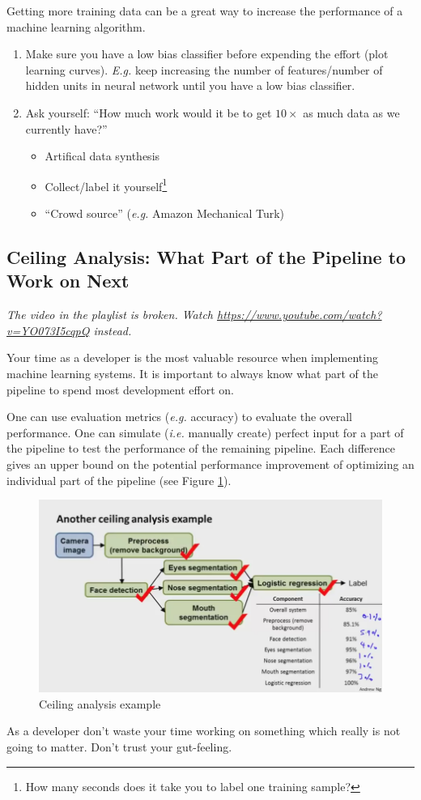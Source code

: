 \documentclass[a4paper,twoside,10pt]{article}
\begin{document}
Getting more training data can be a great way to increase the performance of a machine learning algorithm.
\begin{enumerate}
  \item Make sure you have a low bias classifier before expending the effort (plot learning curves). \emph{E.g.} keep increasing the number of features/number of hidden units in neural network until you have a low bias classifier.
  \item Ask yourself: ``How much work would it be to get $10\times$ as much data as we currently have?''
    \begin{itemize}
      \item Artifical data synthesis
      \item Collect/label it yourself\footnote{How many seconds does it take you to label one training sample?}
      \item ``Crowd source'' (\emph{e.g.} Amazon Mechanical Turk)
    \end{itemize}
\end{enumerate}

\subsection{Ceiling Analysis: What Part of the Pipeline to Work on Next}
\begin{footnotesize}
  \emph{The video in the playlist is broken. Watch \url{https://www.youtube.com/watch?v=YO073I5cqpQ} instead.}
\end{footnotesize}
Your time as a developer is the most valuable resource when implementing machine learning systems.
It is important to always know what part of the pipeline to spend most development effort on.

One can use evaluation metrics (\emph{e.g.} accuracy) to evaluate the overall performance.
One can simulate (\emph{i.e.} manually create) perfect input for a part of the pipeline to test the performance of the remaining pipeline. Each difference gives an upper bound on the potential performance improvement of optimizing an individual part of the pipeline (see Figure \ref{fig:ceiling}).
\begin{figure}[htbp]
  \begin{center}
    \includegraphics[width=.6\textwidth]{ceiling}
    \caption{Ceiling analysis example\citep{andrewng}\label{fig:ceiling}}
  \end{center}
\end{figure}
As a developer don't waste your time working on something which really is not going to matter. Don't trust your gut-feeling.
\end{document}
